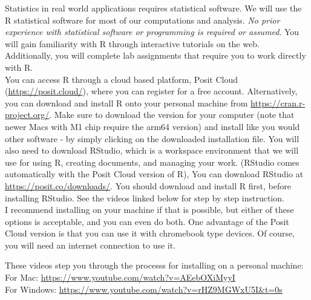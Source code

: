 Statistics in real world applications requires statistical software. We will use the R statistical software for most of our computations and analysis. {\it No prior experience with statistical software or programming is required or assumed}. You will gain familiarity with R through interactive tutorials on the web.  Additionally, you will complete lab assignments that require you to work directly with R.\\

You can access R through a cloud based platform, Posit Cloud (\url{https://posit.cloud/}), where you can register for a free account. Alternatively, you can download and install R onto your personal machine from \url{https://cran.r-project.org/}. Make sure to download the version for your computer (note that newer Macs with M1 chip require the arm64 version) and install like you would other software - by simply clicking on the downloaded installation file. You will also need to download RStudio, which is a workspace environment that we will use for using R, creating documents, and managing your work. (RStudio comes automatically with the Posit Cloud version of R), You can download RStudio at \url{https://posit.co/downloads/}. You should download and install R first, before installing RStudio. See the videos linked below for step by step instruction.\\

I recommend installing on your machine if that is possible, but either of these options is acceptable, and you can even do both. One advantage of the Posit Cloud version is that you can use it with chromebook type devices. Of course, you will need an internet connection to use it.  %



These videos  step you through the processs for installing on a personal machine:\\
For Mac: \url{https://www.youtube.com/watch?v=AEebOXiMyyI}\\
For Windows: \url{https://www.youtube.com/watch?v=rHZ9MGWxU5I&t=0s}\\


